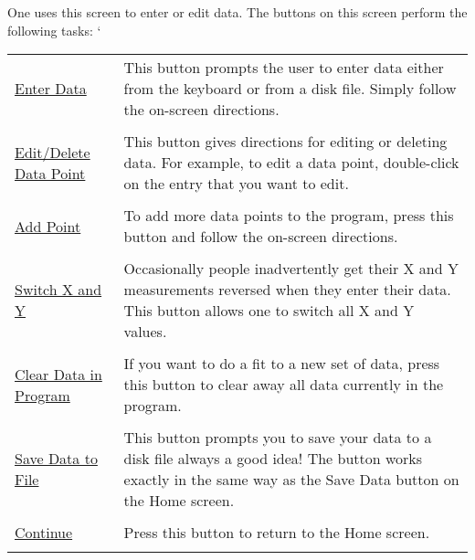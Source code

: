 One uses this screen to enter or edit data.  The buttons on this
screen perform the following tasks:
`
\begin{tabular} {l p{3in}}
\underline{Enter Data}     &   This button prompts the user to enter
                               data either from the keyboard or from a
                               disk file.  Simply follow the on-screen
                               directions.  \\ \\
%
\underline{Edit/Delete Data Point} \hspace{1in} &
                               This button gives directions for
                               editing or deleting data.  For example,
                               to edit a data point, double-click on
                               the entry that you
                               want to edit. \\ \\

\underline{Add Point} &	       To add more data points to the
                               program, press this button and follow
                               the on-screen directions.  \\ \\


\underline{Switch X and Y}  &  Occasionally people inadvertently get
                               their X and Y measurements reversed
                               when they enter their data.  This
                               button allows one to switch all X and Y
                               values.  \\ \\


\underline{Clear Data in Program}  &	
                               If you want to do a fit to a new set of
                               data, press this button to clear away
                               all data currently in the program.\\ \\

\underline{Save Data to File}	&
                               This button prompts you to save your
                               data to a disk file always a good idea!
                               The button works exactly in the same way
                               as the Save Data button on the Home
                               screen.  \\ \\

\underline{Continue}  &  Press this button to return to the Home
                         screen. \\ \\


\end{tabular}

